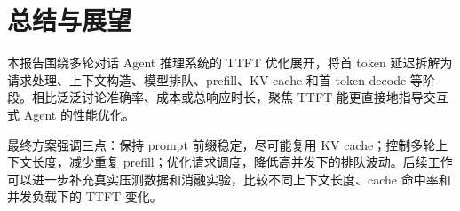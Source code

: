 \section{总结与展望}

本报告围绕多轮对话 Agent 推理系统的 TTFT 优化展开，将首 token 延迟拆解为请求处理、上下文构造、模型排队、prefill、KV cache 和首 token decode 等阶段。相比泛泛讨论准确率、成本或总响应时长，聚焦 TTFT 能更直接地指导交互式 Agent 的性能优化。

最终方案强调三点：保持 prompt 前缀稳定，尽可能复用 KV cache；控制多轮上下文长度，减少重复 prefill；优化请求调度，降低高并发下的排队波动。后续工作可以进一步补充真实压测数据和消融实验，比较不同上下文长度、cache 命中率和并发负载下的 TTFT 变化。
